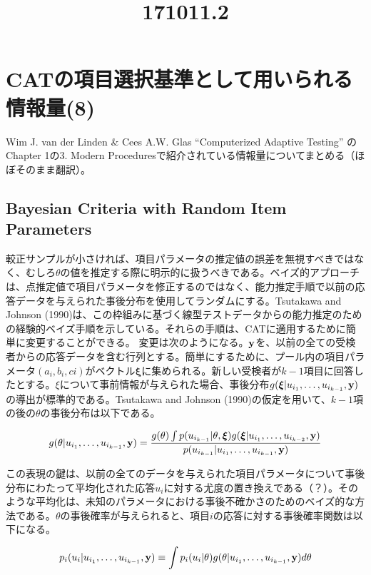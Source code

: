 \documentclass[a4j]{jarticle}
\date{}
\title{171011.2}
\begin{document}
\maketitle

\section{CATの項目選択基準として用いられる情報量(8)}
Wim J. van der Linden \& Cees A.W. Glas ``Computerized Adaptive Testing'' \cite{b1}のChapter 1の3. Modern Proceduresで紹介されている情報量についてまとめる（ほぼそのまま翻訳）。

\subsection{Bayesian Criteria with Random Item Parameters}
較正サンプルが小さければ、項目パラメータの推定値の誤差を無視すべきではなく、むしろ$\theta$の値を推定する際に明示的に扱うべきである。ベイズ的アプローチは、点推定値で項目パラメータを修正するのではなく、能力推定手順で以前の応答データを与えられた事後分布を使用してランダムにする。Tsutakawa and Johnson (1990)は、この枠組みに基づく線型テストデータからの能力推定のための経験的ベイズ手順を示している。それらの手順は、CATに適用するために簡単に変更することができる。
変更は次のようになる。$\bm{{\rm y}}$を、以前の全ての受検者からの応答データを含む行列とする。簡単にするために、プール内の項目パラメータ$(a_{i},b_{i},c{i})$がベクトル$\bm{\xi}$に集められる。新しい受検者が$k-1$項目に回答したとする。$\xi$について事前情報が与えられた場合、事後分布$g(\bm{\xi}|u_{i_{1}},\ldots,u_{i_{k-1}},\bm{{\rm y}})$の導出が標準的である。Tsutakawa and Johnson (1990)の仮定を用いて、$k-1$項の後の$\theta$の事後分布は以下である。

\begin{eqnarray}
  \label{e1}
  g(\theta|u_{i_{1}},\ldots,u_{i_{k-1}},\bm{{\rm y}})=\frac{g(\theta)\int p(u_{i_{k-1}}|\theta,\bm{\xi})g(\bm{\xi}|u_{i_{1}},\ldots,u_{i_{k-2}},\bm{{\rm y}})}{p(u_{i_{k-1}}|u_{i_{1}},\ldots,u_{i_{k-1}},\bm{{\rm y}})}
\end{eqnarray}

この表現の鍵は、以前の全てのデータを与えられた項目パラメータについて事後分布にわたって平均化された応答$u_{i}$に対する尤度の置き換えである（？）。そのような平均化は、未知のパラメータにおける事後不確かさのためのベイズ的な方法である。$\theta$の事後確率が与えられると、項目$i$の応答に対する事後確率関数は以下になる。

\begin{eqnarray}
  \label{e2}
  p_{i}(u_{i}|u_{i_{1}},\ldots,u_{i_{k-1}},\bm{{\rm y}})\equiv\int p_{i}(u_{i}|\theta)g(\theta|u_{i_{1}},\ldots,u_{i_{k-1}},\bm{{\rm y}})d\theta
\end{eqnarray}
\end{document}
